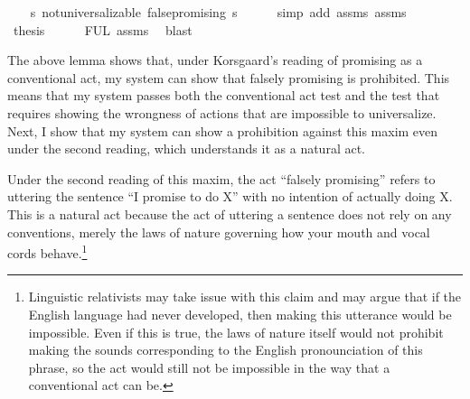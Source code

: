 \begin{isabellebody}
%
\isadelimproof
%
\endisadelimproof
%
\isatagproof
{}\isamarkupfalse%
{\isacharminus}\isanewline
\ \ \isamarkupfalse%
\ {\isachardoublequoteopen}{\isasymforall}s{\isachardot}\ not{\isacharunderscore}universalizable\ false{\isacharunderscore}promising\ s{\isachardoublequoteclose}\isanewline
\ \ \ \ \isamarkupfalse%
\ {\isacharparenleft}simp\ add{\isacharcolon}\ assms{\isacharparenleft}{}{\isacharparenright}\ assms{\isacharparenleft}{}{\isacharparenright}{\isacharparenright}\isanewline
%
\isanewline
\ \ \isamarkupfalse%
\ {\isacharquery}thesis\isanewline
\ \ \ \ \isamarkupfalse%
\ FUL\ assms{\isacharparenleft}{}{\isacharparenright}\ \isamarkupfalse%
\ blast\ \isanewline
{}\isamarkupfalse%
%
\endisatagproof
{\isafoldproof}%
%
\isadelimproof
%
\endisadelimproof
%
\begin{isamarkuptext}%
The above lemma shows that, under Korsgaard's reading of promising as a conventional act, 
my system can show that falsely promising is prohibited. This means that my system passes both
the conventional act test and the test that requires showing the wrongness of actions that are 
impossible to universalize. Next, I show that my system can show a prohibition against this maxim
even under the second reading, which understands it as a natural act.

Under the second reading of this maxim, the act ``falsely promising'' refers to uttering the
sentence ``I promise to do X'' with no intention of actually doing X. This is a natural act because the act of uttering a sentence does not rely 
on any conventions, merely the laws of nature governing how your mouth and vocal cords behave.\footnote{
Linguistic relativists may take issue with this claim and may argue that if the English language had 
never developed, then making this utterance would be impossible. Even if this is true, the laws of 
nature itself would not prohibit making the sounds corresponding to the English pronounciation of 
this phrase, so the act would still not be impossible in the way that a conventional act can be.} 


\end{isamarkuptext}
\end{isabellebody}
